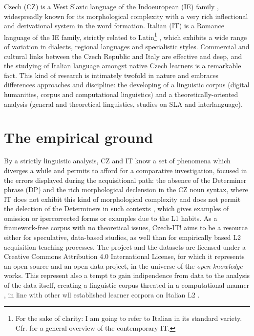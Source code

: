 \documentclass[a4paper,twoside,11pt,chapterprefix=true,listof=totocnumbered,bibliography=totocnumbered]{scrbook}
\theoremstyle{definition}
\theoremstyle{definition}
\theoremstyle{definition}
\theoremstyle{remark}
\begin{document}
Czech (CZ) is a West Slavic language of the Indoeuropean (IE) family
\citep[\citet{glottolog}]{beekes_comparative_2011}, widespreadly known
for its morphological complexity with a very rich inflectional and
derivational system in the word formation. Italian (IT) is a Romance
language of the IE family, strictly related to Latin\footnote{For the
  sake of clarity: I am going to refer to Italian in its standard
  variety. Cfr.
  \citep[\citet{d_achille-italiano}]{berruto2012sociolinguistica} for a
  general overview of the contemporary IT.} , which exhibits a wide
range of variation in dialects, regional languages and specialistic
styles. Commercial and cultural links between the Czech Republic and
Italy are effective and deep, and the studying of Italian language
amongst native Czech learners is a remarkable fact. This kind of
research is intimately twofold in nature and embraces differences
approaches and discipline: the developing of a linguistic corpus
(digital humanities, corpus and computational linguistics) and a
theoretically-oriented analysis (general and theoretical linguistics,
studies on SLA and interlanguage).

\section{The empirical ground}\label{the-empirical-ground}

By a strictly linguistic analysis, CZ and IT know a set of phenomena
which diverges a while and permits to afford for a comparative
investigation, focused in the errors displayed during the acquisitional
path: the absence of the Determiner phrase (DP) and the rich
morphological declension in the CZ noun syntax, where IT does not
exhibit this kind of morphological complexity and does not permit the
delection of the Determiners in such contexts
\citep[\citet{longobardi-n_movement}]{bianchi-1992}, which gives
examples of omission or ipercorrected forms or examples due to the L1
habits. As a framework-free corpus with no theoretical issues, Czech-IT!
aims to be a resource either for speculative, data-based studies, as
well than for empirically based L2 acquisition teaching processes. The
project and the datasets are licensed under a Creative Commons
Attribution 4.0 International License, for which it represents an open
source and an open data project, in the universe of the \emph{open
knowledge} works. This represent also a tempt to gain indipendence from
data to the analysis of the data itself, creating a linguistic corpus
threated in a computational manner
\citep[\citet{kuebler-corpus_linguistics}, \citet{schmid-treetagger},
\citet{bird-nltk}, \citet{kurdi_natural_2016-2},
\citet{clark_handbook_2010-1}]{abney1997}, in line with other wll
established learner corpora on Italian L2 \citep[\citet{lips}]{valico}.
\end{document}
